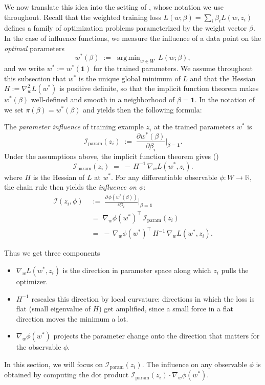 \documentclass[11pt]{article}
\DeclareMathOperator*{\argmin}{arg\,min}
\begin{document}
We now translate this idea into the setting of , whose notation we use throughout. Recall that the weighted training loss $L(w;\beta) = \sum_i \beta_i L(w,z_i)$ defines a family of optimization problems parameterized by the weight vector $\beta$. In the case of influence functions, we measure the influence of a data point on the \emph{optimal} parameters  
\[
  w^*(\beta) \;:=\; \argmin_{w\in W}\, L(w;\beta),
\]
and we write $w^* := w^*(\mathbf{1})$ for the trained parameters. We assume throughout this subsection that $w^*$ is the unique global minimum of $L$ and that the Hessian $H := \nabla_w^2 L(w^*)$ is positive definite, so that the implicit function theorem makes $w^*(\beta)$ well-defined and smooth in a neighborhood of $\beta=\mathbf{1}$. In the notation of  we set $\pi(\beta)= w^*(\beta)$ and  yields then the following formula:

\begin{definition}\label{def:if}
The \emph{parameter influence} of training example $z_i$ at the trained parameters $w^*$ is
\[
  \mathcal{I}_{\mathrm{param}}(z_i) \;:=\; \frac{\partial w^*(\beta)}{\partial \beta_i}\bigg\rvert_{\beta=\mathbf{1}}.
\]
Under the assumptions above, the implicit function theorem gives ()
\[
  \boxed{\;\mathcal{I}_{\mathrm{param}}(z_i) \;=\; -\,H^{-1}\,\nabla_w L(w^*,z_i).\;}
\]
where $H$ is the Hessian of $L$ at $w^*$.
For any differentiable observable $\phi:W\to\mathbb{R}$, the chain rule then yields the \emph{influence on $\phi$}:
\begin{align*}
  \mathcal{I}(z_i,\phi) \; 
  &:=\; \frac{\partial\,\phi(w^*(\beta))}{\partial \beta_i}\bigg\rvert_{\beta=\mathbf{1}} \\
  & =\; \nabla_w \phi(w^*)^\top\,\mathcal{I}_{\mathrm{param}}(z_i) \\
  & =\; -\,\nabla_w \phi(w^*)^\top\,H^{-1}\,\nabla_w L(w^*,z_i).
\end{align*}
\end{definition}

Thus we get three components
\begin{itemize}
  \item $\nabla_w L(w^*,z_i)$ is the direction in parameter space along which $z_i$ pulls the optimizer.
  \item $H^{-1}$ rescales this direction by local curvature: directions in which the loss is flat (small eigenvalue of $H$) get amplified, since a small force in a flat direction moves the minimum a lot.
  \item $\nabla_w \phi(w^*)$ projects the parameter change onto the direction that matters for the observable $\phi$.
\end{itemize}
In this section, we will focus on $\mathcal{I}_{\mathrm{param}}(z_i)$. The influence on any observable $\phi$ is obtained by computing the dot product $\mathcal{I}_{\mathrm{param}}(z_i) \cdot \nabla_w\phi(w^*)$.
\end{document}

